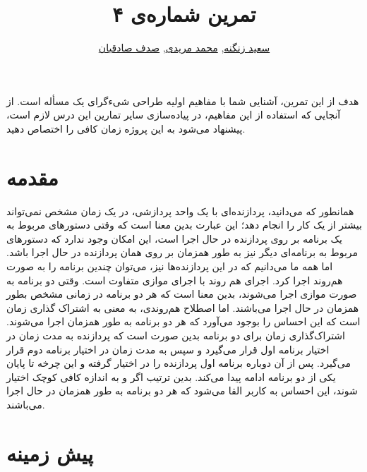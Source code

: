 \documentclass{utap}
\title{تمرین شماره‌ی ۴}
\author{ \href{mailto:zangenehsaeed412@gmail.com?subject=[AP\%20S98 A4]\%20}{سعید زنگنه},
\href{mailto:m.moridi@ut.ac.ir?subject=[AP\%20S98 A4]\%20}{محمد مریدی},
\href{mailto:sadeghian.sadaf22@gmail.com?subject=[AP\%20S98 A4]\%20}{صدف صادقیان}}
\begin{document}
	\maketitle
	
	هدف از این تمرین، آشنایی شما با مفاهیم اولیه طراحی شی‌ءگرای یک مسأله است. از آنجایی که استفاده از این مفاهیم، در پیاده‌سازی سایر تمارین این درس لازم است، پیشنهاد می‌شود به این پروژه زمان کافی را اختصاص دهید.
	\section{مقدمه}
	
	\hspace{5mm}
همانطور که می‌دانید، پردازنده‌ای با یک واحد پردازشی، در یک زمان مشخص نمی‌تواند بیشتر از یک کار را انجام دهد؛ این عبارت بدین معنا است که وقتی دستورهای مربوط به یک برنامه بر روی پردازنده در حال اجرا است، این امکان وجود ندارد که دستورهای مربوط به برنامه‌ای دیگر نیز به طور همزمان بر روی همان پردازنده در حال اجرا باشد. اما همه ما می‌دانیم که در این پردازنده‌ها نیز، می‌توان چندین برنامه را به صورت هم‌روند اجرا کرد. اجرای هم روند با اجرای موازی  متفاوت است. وقتی دو برنامه به صورت موازی اجرا می‌شوند، بدین معنا است که هر دو برنامه در زمانی مشخص بطور همزمان در حال اجرا می‌باشند. اما اصطلاح هم‌روندی، به معنی به اشتراک گذاری زمان  است که این احساس را بوجود می‌آورد که هر دو برنامه به طور همزمان اجرا می‌شوند. اشتراک‌گذاری زمان برای دو برنامه بدین صورت است که پردازنده به مدت زمان  در اختیار برنامه اول قرار می‌گیرد و سپس به مدت زمان   در اختیار برنامه دوم قرار می‌گیرد. پس از آن دوباره برنامه اول پردازنده را در اختیار گرفته و این چرخه تا پایان یکی از دو برنامه ادامه پیدا می‌کند. بدین ترتیب اگر   و   به اندازه کافی کوچک اختیار شوند، این احساس به کاربر القا می‌شود که هر دو برنامه به طور همزمان در حال اجرا می‌باشند.
	
	\section{پیش زمینه}
\end{document}

